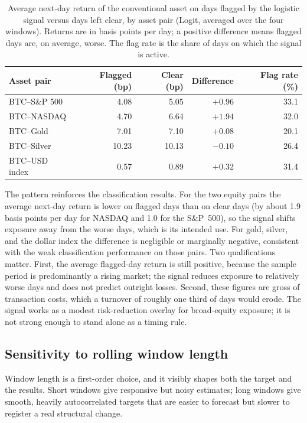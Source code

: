 \begin{table}[H]
    \centering
    \caption{Average next-day return of the conventional asset on days flagged by the logistic signal versus days left clear, by asset pair (Logit, averaged over the four windows). Returns are in basis points per day; a positive difference means flagged days are, on average, worse. The flag rate is the share of days on which the signal is active.}
    \label{tab:signal_returns}
    \begin{tabular}{lrrrr}
        \toprule
        Asset pair & Flagged (bp) & Clear (bp) & Difference & Flag rate (\%) \\
        \midrule
        BTC--S\&P 500  & 4.08 & 5.05 & $+0.96$ & 33.1 \\
        BTC--NASDAQ    & 4.70 & 6.64 & $+1.94$ & 32.0 \\
        BTC--Gold      & 7.01 & 7.10 & $+0.08$ & 20.1 \\
        BTC--Silver    & 10.23 & 10.13 & $-0.10$ & 26.4 \\
        BTC--USD index & 0.57 & 0.89 & $+0.32$ & 31.4 \\
        \bottomrule
    \end{tabular}
\end{table}

The pattern reinforces the classification results. For the two equity pairs the average next-day return is lower on flagged days than on clear days (by about 1.9 basis points per day for NASDAQ and 1.0 for the S\&P~500), so the signal shifts exposure away from the worse days, which is its intended use. For gold, silver, and the dollar index the difference is negligible or marginally negative, consistent with the weak classification performance on those pairs. Two qualifications matter. First, the average flagged-day return is still positive, because the sample period is predominantly a rising market; the signal reduces exposure to relatively worse days and does not predict outright losses. Second, these figures are gross of transaction costs, which a turnover of roughly one third of days would erode. The signal works as a modest risk-reduction overlay for broad-equity exposure; it is not strong enough to stand alone as a timing rule.

\subsection{Sensitivity to rolling window length}

Window length is a first-order choice, and it visibly shapes both the target and the results. Short windows give responsive but noisy estimates; long windows give smooth, heavily autocorrelated targets that are easier to forecast but slower to register a real structural change.


